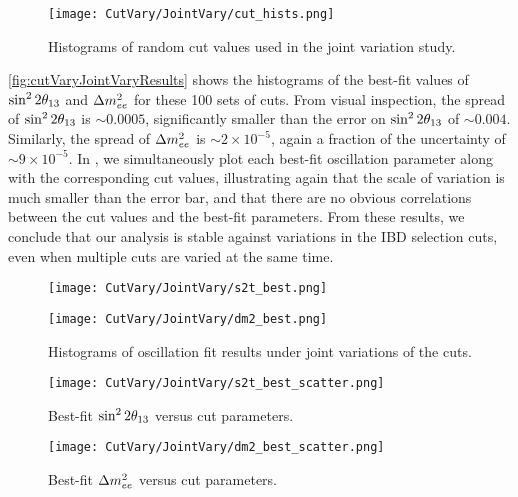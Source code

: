 \documentclass[../thesis.tex]{subfiles}
\begin{document}
\begin{figure}[h]
  \texttt{[image: CutVary/JointVary/cut\_hists.png]}
  \caption{Histograms of random cut values used in the joint variation study.}
  \label{fig:cutVaryJointVaryCutHists}
\end{figure}

\autoref{fig:cutVaryJointVaryResults} shows the histograms of the best-fit values of $\sin^2 2\theta_{13}$ and $\Delta m^2_{ee}$ for these 100 sets of cuts. From visual inspection, the spread of $\sin^2 2\theta_{13}$ is $\sim0.0005$, significantly smaller than the error on $\sin^2 2\theta_{13}$ of $\sim0.004$. Similarly, the spread of $\Delta m^2_{ee}$ is $\sim2\times10^{-5}$, again a fraction of the uncertainty of $\sim9\times10^{-5}$. In , we simultaneously plot each best-fit oscillation parameter along with the corresponding cut values, illustrating again that the scale of variation is much smaller than the error bar, and that there are no obvious correlations between the cut values and the best-fit parameters. From these results, we conclude that our analysis is stable against variations in the IBD selection cuts, even when multiple cuts are varied at the same time.

\begin{figure}[ht]
  \begin{minipage}{0.5\linewidth}%
    \texttt{[image: CutVary/JointVary/s2t\_best.png]}%
  \end{minipage}%
  \begin{minipage}{0.5\linewidth}%
    \texttt{[image: CutVary/JointVary/dm2\_best.png]}
  \end{minipage}%
  \caption{Histograms of oscillation fit results under joint variations of the cuts.}
  \label{fig:cutVaryJointVaryResults}
\end{figure}

\begin{figure}[h]
  \texttt{[image: CutVary/JointVary/s2t\_best\_scatter.png]}
  \caption{Best-fit $\sin^2 2\theta_{13}$ versus cut parameters.}
  \label{fig:cutVaryJointVaryS2tScatter}
\end{figure}

\begin{figure}[h]
  \texttt{[image: CutVary/JointVary/dm2\_best\_scatter.png]}
  \caption{Best-fit $\Delta m^2_{ee}$ versus cut parameters.}
  \label{fig:cutVaryJointVaryDm2Scatter}
\end{figure}
\end{document}
